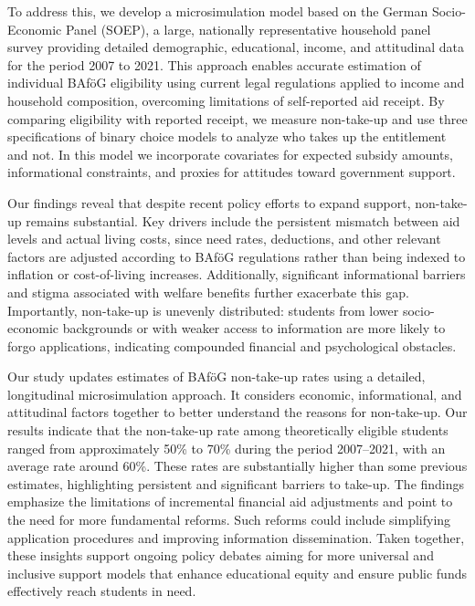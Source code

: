 
To address this, we develop a microsimulation model based on the German Socio-Economic Panel (SOEP), a large, nationally representative household panel survey providing detailed demographic, educational, income, and attitudinal data for the period 2007 to 2021.
This approach enables accurate estimation of individual BAföG eligibility using current legal regulations applied to income and household composition, overcoming limitations of self-reported aid receipt. 
By comparing eligibility with reported receipt, we measure non-take-up and use three specifications of binary choice models to analyze who takes up the entitlement and not. 
In this model we incorporate covariates for expected subsidy amounts, informational constraints, and proxies for attitudes toward government support. 


Our findings reveal that despite recent policy efforts to expand support, non-take-up remains substantial. 
Key drivers include the persistent mismatch between aid levels and actual living costs, since need rates, deductions, and other relevant factors are adjusted according to BAföG regulations rather than being indexed to inflation or cost-of-living increases. 
Additionally, significant informational barriers and stigma associated with welfare benefits further exacerbate this gap.
Importantly, non-take-up is unevenly distributed: students from lower socio-economic backgrounds or with weaker access to information are more likely to forgo applications, indicating compounded financial and psychological obstacles.

Our study updates estimates of BAföG non-take-up rates using a detailed, longitudinal microsimulation approach. 
It considers economic, informational, and attitudinal factors together to better understand the reasons for non-take-up.
Our results indicate that the non-take-up rate among theoretically eligible students ranged from approximately 50\% to 70\% during the period 2007--2021, with an average rate around 60\%. 
These rates are substantially higher than some previous estimates, highlighting persistent and significant barriers to take-up. 
The findings emphasize the limitations of incremental financial aid adjustments and point to the need for more fundamental reforms. 
Such reforms could include simplifying application procedures and improving information dissemination.
Taken together, these insights support ongoing policy debates aiming for more universal and inclusive support models that enhance educational equity and ensure public funds effectively reach students in need.


